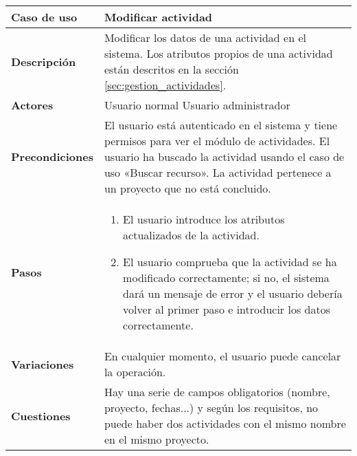 \begin{tabular}{|p{1.25in}|p{3.65in}|}\hline
\textbf{Caso de uso} & \textbf{Modificar actividad}\\\hline\hline
\textbf{Descripción} & Modificar los datos de una actividad en el sistema. Los
atributos propios de una actividad están descritos en la sección
\ref{sec:gestion_actividades}. \\\hline
\textbf{Actores} & Usuario normal \newline Usuario administrador\\\hline
\textbf{Precondiciones} & El usuario está autenticado en el sistema y
tiene permisos para ver el módulo de actividades. \newline El usuario ha
buscado la actividad usando el caso de uso «Buscar recurso». \newline La
actividad pertenece a un proyecto que no está concluido.\\\hline
\textbf{Pasos} &
  \begin{enumerate}
   \item El usuario introduce los atributos actualizados de la actividad.
   \item El usuario comprueba que la actividad se ha modificado correctamente;
si no, el sistema dará un mensaje de error y el usuario debería volver al primer
paso e introducir los datos correctamente.
  \end{enumerate}
\\\hline
\textbf{Variaciones} & En cualquier momento, el usuario puede cancelar
la operación.\\\hline
\textbf{Cuestiones} & Hay una serie de campos obligatorios (nombre,
proyecto, fechas...) y según los requisitos, no puede haber dos actividades
con el mismo nombre en el mismo proyecto.\\\hline
\end{tabular}

